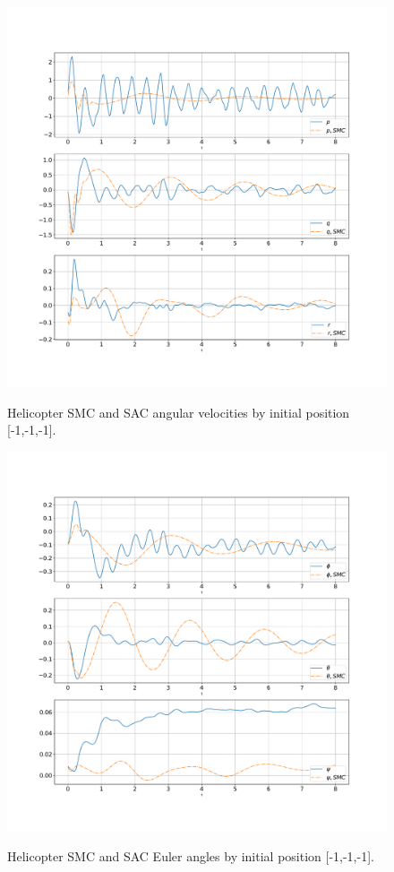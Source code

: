 \begin{figure}
	\begin{center}
		{\includegraphics[scale=0.41]{omega.pdf}}
		\caption{Helicopter SMC and SAC angular velocities by initial position [-1,-1,-1].}
		\label{omega}
	\end{center}
\end{figure}

\begin{figure}
	\begin{center}
		{\includegraphics[scale=0.41]{theta.pdf}}
		\caption{Helicopter SMC and SAC Euler angles by initial position [-1,-1,-1].}
		\label{theta}
	\end{center}
\end{figure}

